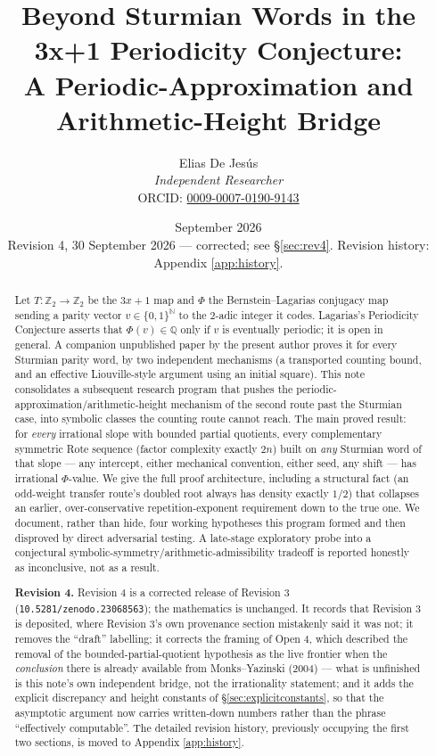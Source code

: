\documentclass[11pt]{article}
\title{Beyond Sturmian Words in the 3x+1 Periodicity Conjecture:\\
A Periodic-Approximation and Arithmetic-Height Bridge}
\author{Elias De Jesús\\
\textit{Independent Researcher}\\
ORCID: \href{https://orcid.org/0009-0007-0190-9143}{0009-0007-0190-9143}}
\date{September 2026 \\[2pt] \textnormal{\small Revision 4, 30 September 2026 --- corrected; see \S\ref{sec:rev4}. Revision history: Appendix \ref{app:history}.}}
\newcommand{\Q}{\mathbb{Q}}
\newcommand{\Z}{\mathbb{Z}}
\newcommand{\N}{\mathbb{N}}
\begin{document}
\sloppy
\maketitle

\begin{abstract}
Let $T:\Z_2\to\Z_2$ be the $3x+1$ map and $\Phi$ the Bernstein--Lagarias conjugacy map sending a parity vector $v\in\{0,1\}^\N$ to the 2-adic integer it codes. Lagarias's Periodicity Conjecture asserts that $\Phi(v)\in\Q$ only if $v$ is eventually periodic; it is open in general. A companion unpublished paper by the present author proves it for every Sturmian parity word, by two independent mechanisms (a transported counting bound, and an effective Liouville-style argument using an initial square). This note consolidates a subsequent research program that pushes the periodic-approximation/arithmetic-height mechanism of the second route past the Sturmian case, into symbolic classes the counting route cannot reach. The main proved result: for \emph{every} irrational slope with bounded partial quotients, every complementary symmetric Rote sequence (factor complexity exactly $2n$) built on \emph{any} Sturmian word of that slope --- any intercept, either mechanical convention, either seed, any shift --- has irrational $\Phi$-value. We give the full proof architecture, including a structural fact (an odd-weight transfer route's doubled root always has density exactly $1/2$) that collapses an earlier, over-conservative repetition-exponent requirement down to the true one. We document, rather than hide, four working hypotheses this program formed and then disproved by direct adversarial testing. A late-stage exploratory probe into a conjectural symbolic-symmetry/arithmetic-admissibility tradeoff is reported honestly as inconclusive, not as a result.

\smallskip
\noindent\textbf{Revision 4.} Revision 4 is a corrected release of Revision 3
(\texttt{10.5281/zenodo.23068563}); the mathematics is unchanged. It records that Revision 3 is
deposited, where Revision 3's own provenance section mistakenly said it was not; it removes the
``draft'' labelling; it corrects the framing of Open 4, which described the removal of the
bounded-partial-quotient hypothesis as the live frontier when the \emph{conclusion} there is already
available from Monks--Yazinski (2004) --- what is unfinished is this note's own independent bridge,
not the irrationality statement; and it adds the explicit discrepancy and height constants of
\S\ref{sec:explicitconstants}, so that the asymptotic argument now carries written-down numbers rather
than the phrase ``effectively computable''. The detailed revision history, previously occupying the
first two sections, is moved to Appendix \ref{app:history}.


\end{abstract}
\end{document}
